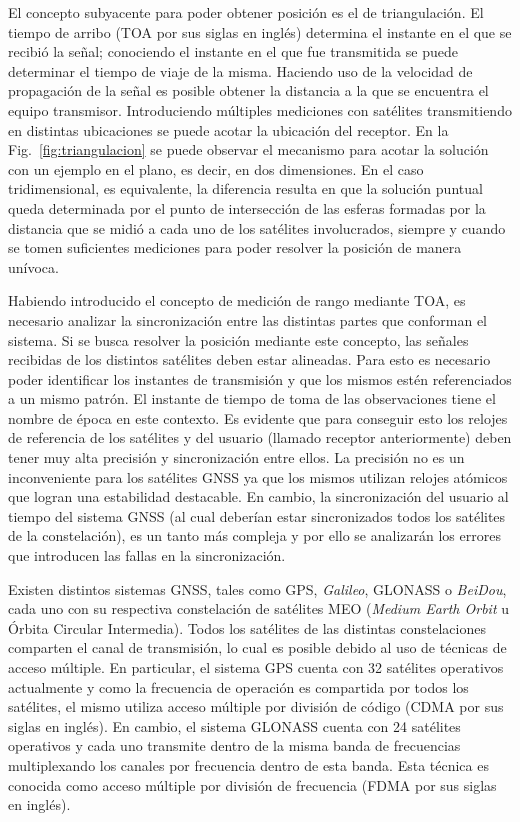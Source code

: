 \documentclass[a4paper,12pt,oneside,onecolumn,final,openright]{book}%
\begin{document}
	El concepto subyacente para poder obtener posición es el de triangulación. El tiempo de arribo (TOA por sus siglas en inglés) determina el instante en el que se recibió la señal; conociendo el instante en el que fue transmitida se puede determinar el tiempo de viaje de la misma. Haciendo uso de la velocidad de propagación de la señal es posible obtener la distancia a la que se encuentra el equipo transmisor. Introduciendo múltiples mediciones con satélites transmitiendo en distintas ubicaciones se puede acotar la ubicación del receptor. En la Fig.~\ref{fig:triangulacion} se puede observar el mecanismo para acotar la solución con un ejemplo en el plano, es decir, en dos dimensiones. En el caso tridimensional, es equivalente, la diferencia resulta en que la solución puntual queda determinada por el punto de intersección de las esferas formadas por la distancia que se midió a cada uno de los satélites involucrados, siempre y cuando se tomen suficientes mediciones para poder resolver la posición de manera unívoca.
	
	Habiendo introducido el concepto de medición de rango mediante TOA, es necesario analizar la sincronización entre las distintas partes que conforman el sistema. Si se busca resolver la posición mediante este concepto, las señales recibidas de los distintos satélites deben estar alineadas. Para esto es necesario poder identificar los instantes de transmisión y que los mismos estén referenciados a un mismo patrón. El instante de tiempo de toma de las observaciones tiene el nombre de época en este contexto. Es evidente que para conseguir esto los relojes de referencia de los satélites y del usuario (llamado receptor anteriormente) deben tener muy alta precisión y sincronización entre ellos. La precisión no es un inconveniente para los satélites GNSS ya que los mismos utilizan relojes atómicos que logran una estabilidad destacable. En cambio, la sincronización del usuario al tiempo del sistema GNSS (al cual deberían estar sincronizados todos los satélites de la constelación), es un tanto más compleja y por ello se analizarán los errores que introducen las fallas en la sincronización.
	
	Existen distintos sistemas GNSS, tales como GPS, \textit{Galileo}, GLONASS o \textit{BeiDou}, cada uno con su respectiva constelación de satélites MEO (\textit{Medium Earth Orbit} u Órbita Circular Intermedia). Todos los satélites de las distintas constelaciones comparten el canal de transmisión, lo cual es posible debido al uso de técnicas de acceso múltiple. En particular, el sistema GPS cuenta con 32 satélites operativos actualmente y como la frecuencia de operación es compartida por todos los satélites, el mismo utiliza acceso múltiple por división de código (CDMA por sus siglas en inglés). En cambio, el sistema GLONASS cuenta con 24 satélites operativos y cada uno transmite dentro de la misma banda de frecuencias multiplexando los canales por frecuencia dentro de esta banda. Esta técnica es conocida como acceso múltiple por división de frecuencia (FDMA por sus siglas en inglés).
	
\end{document}
